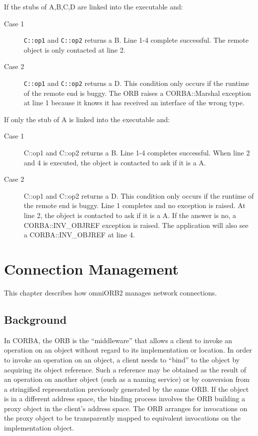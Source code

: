 \documentclass[11pt,twoside,onecolumn]{book}
\begin{document}
\noindent If the stubs of A,B,C,D are linked into the executable and:

\begin{description}
\item[Case 1] {\tt C::op1} and {\tt C::op2} returns a B. Line 1-4 complete successful. The
remote object is only contacted at line 2.
\item[Case 2] {\tt C::op1} and {\tt C::op2} returns a D. This condition only occurs if the
runtime of the remote end is buggy. The ORB raises a CORBA::Marshal
exception at line 1 because it knows it has received an interface of the
wrong type.
\end{description}

\noindent If only the stub of A is linked into the executable and:

\begin{description}
\item[Case 1] C::op1 and C::op2 returns a B. Line 1-4 completes successful. When
line 2 and 4 is executed, the object is contacted to ask if it is a A.
\item[Case 2] C::op1 and C::op2 returns a D. This condition only occurs if the
runtime of the remote end is buggy. Line 1 completes and no exception is
raised. At line 2, the object is contacted to ask if it is a A. If the
answer is no, a CORBA::INV\_OBJREF exception is raised. The application will
also see a CORBA::INV\_OBJREF at line 4.
\end{description}


\chapter{Connection Management}
\label{ch_conn}


This chapter describes how omniORB2 manages network connections.

\section{Background}

In CORBA, the ORB is the ``middleware'' that allows a client to invoke an
operation on an object without regard to its implementation or location. In
order to invoke an operation on an object, a client needs to ``bind'' to
the object by acquiring its object reference. Such a reference may be
obtained as the result of an operation on another object (such as a naming
service) or by conversion from a stringified representation previously
generated by the same ORB. If the object is in a different address space,
the binding process involves the ORB building a proxy object in the
client's address space. The ORB arranges for invocations on the proxy
object to be transparently mapped to equivalent invocations on the
implementation object.
\end{document}
